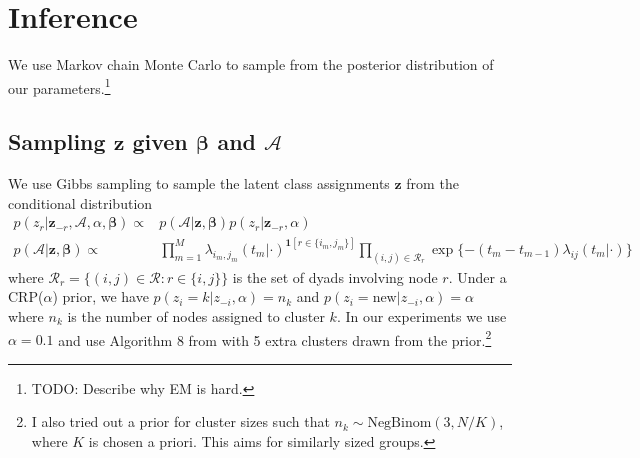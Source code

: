 \documentclass{article}
\begin{document}
\section{Inference}

We use Markov chain Monte Carlo to sample from the posterior distribution of our parameters.\footnote{TODO: Describe why EM is hard.} %

\subsection*{Sampling $\mathbf{z}$ given $\boldsymbol{\beta}$ and $\mathcal{A}$ }

We use Gibbs sampling to sample the latent class assignments $\mathbf{z}$ from the conditional distribution
\begin{align*}
p(z_r | \mathbf{z}_{-r},\mathcal{A},\alpha,\boldsymbol{\beta}) \propto&  p(\mathcal{A}|\mathbf{z},\boldsymbol{\beta}) p(z_r | \mathbf{z}_{-r},\alpha) \\
p(\mathcal{A}|\mathbf{z},\boldsymbol{\beta}) \propto &
\prod_{m=1}^M \lambda_{i_m,j_m}(t_m|\cdot)^{\mathbf{1}[r \in \{i_m,j_m\}]}  \prod_{(i,j) \in \mathcal{R}_r} \exp \{ -(t_m - t_{m-1}) \lambda_{ij}(t_m|\cdot)\} 
\end{align*} 
where $\mathcal{R}_r = \{(i,j) \in \mathcal{R}: r \in \{i,j\}\}$ is the set of dyads involving node $r$.  Under a CRP($\alpha$) prior, we have $p(z_i = k | z_{-i},\alpha) = n_k $ and $p(z_i = \mbox{new} |  z_{-i},\alpha) = \alpha$ where $n_k$ is the number of nodes assigned to cluster $k$.  In our experiments we use $\alpha=0.1$ and use Algorithm 8 from \cite{Neal2001} with 5 extra clusters drawn from the prior.\footnote{I also tried out a prior for cluster sizes such that $n_k \sim \mbox{NegBinom}(3,N/K)$, where $K$ is chosen a priori.  This aims for similarly sized groups.}
\end{document}
